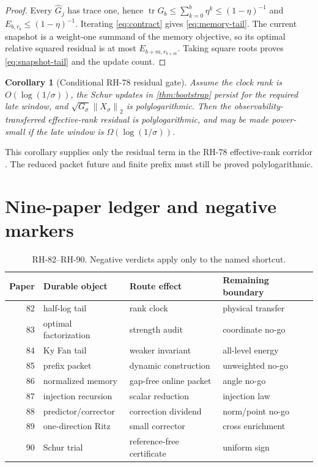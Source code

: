 \documentclass[11pt]{article}
\newtheorem{corollary}[theorem]{Corollary}
\theoremstyle{remark}
\newcommand{\norm}[1]{\left\lVert#1\right\rVert}
\begin{document}
\begin{proof}
Every $\widehat G_j$ has trace one, hence
$\operatorname{tr}G_b\le\sum_{k=0}^b\eta^k\le(1-\eta)^{-1}$ and
$E_{b,r_b}\le(1-\eta)^{-1}$.  Iterating \eqref{eq:contract} gives
\eqref{eq:memory-tail}.  The current snapshot is a weight-one summand of the
memory objective, so its optimal relative squared residual is at most
$E_{b+m,r_{b+m}}$.  Taking square roots proves \eqref{eq:snapshot-tail} and
the update count.
\end{proof}

\begin{corollary}[Conditional RH-78 residual gate]
Assume the clock rank is $O(\log(1/\sigma))$, the Schur updates in
\cref{thm:bootstrap} persist for the required late window, and
$\sqrt{G_\sigma}\norm{X_\sigma}_2$ is polylogarithmic.  Then the
observability-transferred effective-rank residual is polylogarithmic, and may
be made power-small if the late window is $\Omega(\log(1/\sigma))$.
\end{corollary}

This corollary supplies only the residual term in the RH-78 effective-rank
corridor \citep{WangTwoCorridors2026}.  The reduced packet future and finite
prefix must still be proved polylogarithmic.

\section{Nine-paper ledger and negative markers}

\begin{table}[ht]
\centering
\small
\begin{tabular}{rlll}
\toprule
Paper & Durable object & Route effect & Remaining boundary\\
\midrule
82 & half-log tail & rank clock & physical transfer\\
83 & optimal factorization & strength audit & coordinate no-go\\
84 & Ky Fan tail & weaker invariant & all-level energy\\
85 & prefix packet & dynamic construction & unweighted no-go\\
86 & normalized memory & gap-free online packet & angle no-go\\
87 & injection recursion & scalar reduction & injection law\\
88 & predictor/corrector & correction dividend & norm/point no-go\\
89 & one-direction Ritz & small corrector & cross enrichment\\
90 & Schur trial & reference-free certificate & uniform sign\\
\bottomrule
\end{tabular}
\caption{RH-82--RH-90.  Negative verdicts apply only to the named shortcut.}
\label{tab:ledger}
\end{table}
\end{document}
